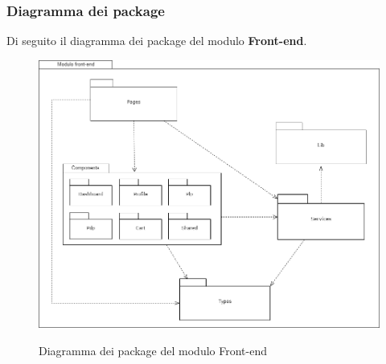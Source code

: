 \subsubsection{Diagramma dei package}

Di seguito il diagramma dei package del modulo \textbf{Front-end}.

\vspace{1cm}

\begin{figure}[H]
\centering
\includegraphics[scale=0.43]{res/Architettura/Frontend/img/package_frontend.png}\\
\caption{Diagramma dei package del modulo Front-end}
\end{figure}